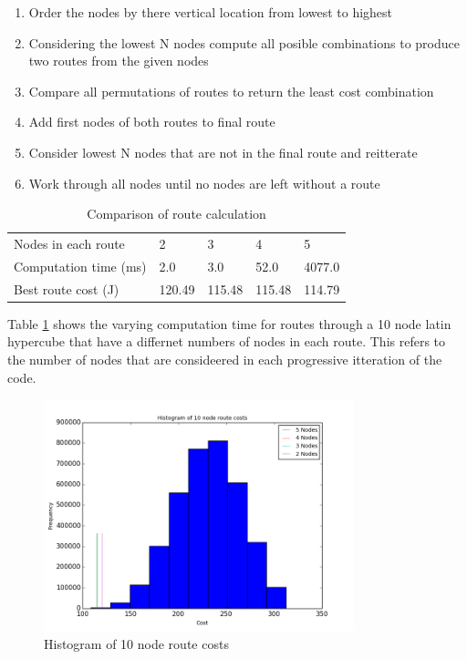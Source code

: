 \documentclass[a4paper,12pt,twoside]{article}
\begin{document}
\begin{enumerate}
\setlength{\itemsep}{-10pt}
\item Order the nodes by there vertical location from lowest to highest
\item Considering the lowest N nodes compute all posible combinations to produce two routes from the given nodes
\item Compare all permutations of routes to return the least cost combination
\item Add first nodes of both routes to final route
\item Consider lowest N nodes that are not in the final route and reitterate
\item Work through all nodes until no nodes are left without a route
\end{enumerate}

\begin{table}[width=\textwidth]
\centering
    \begin{tabular}{lllll}
    Nodes in each route	& 2	& 3	& 4	& 5	\\
Computation time (ms)	& 2.0	& 3.0	& 52.0	& 4077.0	\\
Best route cost (J)	& 120.49	& 115.48	& 115.48	& 114.79	\\

    \end{tabular}
\caption{Comparison of route calculation}
\label{tbl:comparison_of_route_calculation}
\end{table}

Table \ref{tbl:comparison_of_route_calculation} shows the varying computation time for routes through a 10 node latin hypercube that have a differnet numbers of nodes in each route. This refers to the number of nodes that are consideered in each progressive itteration of the code.

\begin{figure}[H]
\centering
\includegraphics[width=0.8\textwidth]{figures/histogram_of_10_node_route_costs.png} 
\caption{Histogram of 10 node route costs}
\label{fig:histogram_of_10_node_route_costs}
\end{figure}
\end{document}
